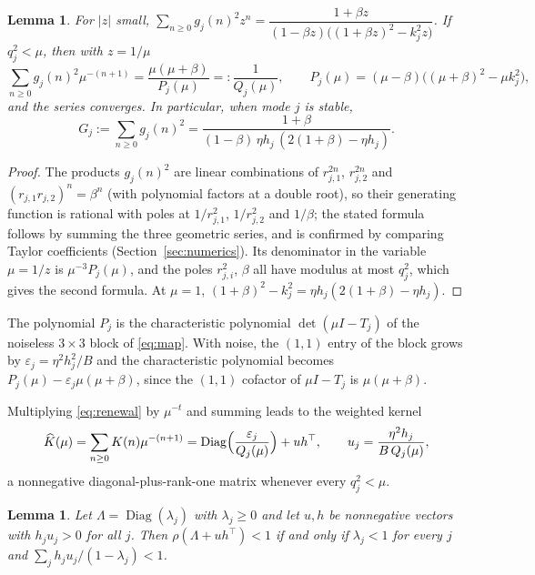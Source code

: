\documentclass[11pt]{amsart}
\newtheorem{lemma}[theorem]{Lemma}
\theoremstyle{definition}
\theoremstyle{remark}
\numberwithin{equation}{section}
\begin{document}
\begin{lemma}\label{lem:gf}
For $|z|$ small, $\sum_{n\ge0}g_j(n)^2z^n=\dfrac{1+\beta z}{(1-\beta z)\bigl((1+\beta z)^2-k_j^2z\bigr)}$. If $q_j^2<\mu$, then with $z=1/\mu$
\[
\sum_{n\ge0}g_j(n)^2\mu^{-(n+1)}=\frac{\mu(\mu+\beta)}{P_j(\mu)}=:\frac1{Q_j(\mu)},\qquad P_j(\mu)=(\mu-\beta)\bigl((\mu+\beta)^2-\mu k_j^2\bigr),
\]
and the series converges. In particular, when mode $j$ is stable,
\[
G_j:=\sum_{n\ge0}g_j(n)^2=\frac{1+\beta}{(1-\beta)\,\eta h_j\,(2(1+\beta)-\eta h_j)} .
\]
\end{lemma}

\begin{proof}
The products $g_j(n)^2$ are linear combinations of $r_{j,1}^{2n}$, $r_{j,2}^{2n}$ and $(r_{j,1}r_{j,2})^n=\beta^n$ (with polynomial factors at a double root), so their generating function is rational with poles at $1/r_{j,1}^2$, $1/r_{j,2}^2$ and $1/\beta$; the stated formula follows by summing the three geometric series, and is confirmed by comparing Taylor coefficients (Section~\ref{sec:numerics}). Its denominator in the variable $\mu=1/z$ is $\mu^{-3}P_j(\mu)$, and the poles $r_{j,i}^2$, $\beta$ all have modulus at most $q_j^2$, which gives the second formula. At $\mu=1$, $(1+\beta)^2-k_j^2=\eta h_j(2(1+\beta)-\eta h_j)$.
\end{proof}

The polynomial $P_j$ is the characteristic polynomial $\det(\mu I-T_j)$ of the noiseless $3\times3$ block of \eqref{eq:map}. With noise, the $(1,1)$ entry of the block grows by $\varepsilon_j=\eta^2h_j^2/B$ and the characteristic polynomial becomes $P_j(\mu)-\varepsilon_j\mu(\mu+\beta)$, since the $(1,1)$ cofactor of $\mu I-T_j$ is $\mu(\mu+\beta)$.

Multiplying \eqref{eq:renewal} by $\mu^{-t}$ and summing leads to the weighted kernel
\begin{equation}\label{eq:khat}
\widehat K(\mu)=\sum_{n\ge0}K(n)\mu^{-(n+1)}=\operatorname{Diag}\Bigl(\frac{\varepsilon_j}{Q_j(\mu)}\Bigr)+uh^\top,\qquad u_j=\frac{\eta^2h_j}{B\,Q_j(\mu)},
\end{equation}
a nonnegative diagonal-plus-rank-one matrix whenever every $q_j^2<\mu$.

\begin{lemma}\label{lem:dr1}
Let $\Lambda=\operatorname{Diag}(\lambda_j)$ with $\lambda_j\ge0$ and let $u,h$ be nonnegative vectors with $h_ju_j>0$ for all $j$. Then $\rho(\Lambda+uh^\top)<1$ if and only if $\lambda_j<1$ for every $j$ and $\sum_jh_ju_j/(1-\lambda_j)<1$.
\end{lemma}
\end{document}
